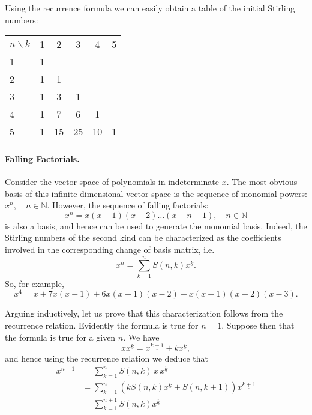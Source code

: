 \documentclass[12pt]{article}
\newcommand{\un}{{\underline{n}}}
\newcommand{\uk}{{\underline{k}}}
\newcommand{\natnums}{\mathbb{N}}
\newcommand{\lp}{\left(}
\newcommand{\rp}{\right)}
\begin{document}
Using the recurrence formula we can easily obtain a table of the
initial Stirling numbers:

\bigskip

\begin{tabular}{lccccc}
$n\backslash k$ & 1 & 2 & 3  & 4 & 5\\
1 & 1 \\
2 & 1 &  1 \\
3 & 1 & 3 & 1 \\
4 & 1 & 7 & 6 & 1 \\
5 & 1 & 15&25 & 10 & 1
\end{tabular}


\paragraph{Falling Factorials.}
Consider the vector space of polynomials in indeterminate $x$.  The
most obvious basis of this infinite-dimensional vector space is the
sequence of monomial powers: $x^n,\quad n\in\natnums.$ However, the
sequence of falling factorials:
$$x^\un=x(x-1)(x-2)\ldots(x-n+1),\quad n\in\natnums$$
is also a basis, and hence can be
used to generate the monomial basis.  Indeed, the Stirling numbers of
the second kind can be characterized as the coefficients involved
in the corresponding change of basis matrix, i.e.
$$ x^n = \sum_{k=1}^n S(n,k) x^\uk.$$
So, for example,
$$x^4 = x + 7x(x-1) + 6x(x-1)(x-2) + x(x-1)(x-2)(x-3).$$

Arguing inductively, let us prove that this characterization follows
from the recurrence relation.  Evidently the formula is true for
$n=1$.  Suppose then that the formula is true for a given $n$.  We
have
$$x x^\uk = x^{\underline{k+1}} + k x^\uk,$$ 
and hence using the recurrence relation we deduce that
\begin{align*}
x^{n+1} &= \sum_{k=1}^n S(n,k)\,x\,x^\uk \\
&= \sum_{k=1}^n \lp kS(n,k) x^\uk + S(n,k+1)\rp x^{\underline{k+1}} \\
&= \sum_{k=1}^{n+1} S(n,k) x^\uk
\end{align*}
\end{document}
